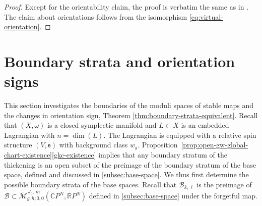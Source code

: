 \documentclass[11pt,psamsfonts, oneside, reqno]{amsart}
\newcommand{\sub}{\subset}%
\newcommand{\Mbar}{\overline{\mathcal M}}
\newcommand{\bC}{\mathbb{C}}
\newcommand{\bR}{\mathbb{R}}
\newcommand{\cB}{\mathcal{B}}
\newcommand{\fs}{\mathfrak{s}}
\theoremstyle{definition}
\theoremstyle{remark}
\numberwithin{equation}{section}
\begin{document}
\begin{proof} Except for the orientability claim, the proof is verbatim the same as in \cite[]{HS22}. The claim about orientations follows from the isomorphism \eqref{eq:virtual-orientation}.
\end{proof}
\section{Boundary strata and orientation signs}\label{subsec:boundary-strata} 
This section investigates the boundaries of the moduli spaces of stable maps and the changes in orientation sign, Theorem \ref{thm:boundary-strata-equivalent}. Recall that $(X,\omega)$ is a closed symplectic manifold and $L \sub X$ is an embedded Lagrangian with $n = \dim(L)$. The Lagrangian is equipped with a relative spin structure $(V,\fs)$ with background class $w_\fs$. Proposition~\ref{prop:open-gw-global-chart-existence}\eqref{gkc-existence} implies that any boundary stratum of the thickening is an open subset of the preimage of the boundary stratum of the base space, defined and discussed in \textsection\ref{subsec:base-space}. We thus first determine the possible boundary strata of the base spaces. Recall that $\cB_{k,\ell}$ is the preimage of $\cB\sub \Mbar_{g,h;0,0}^{\,J_0,\,m}(\bC P^N,\bR P^N)$ defined in \textsection\ref{subsec:base-space} under the forgetful map.
\end{document}
